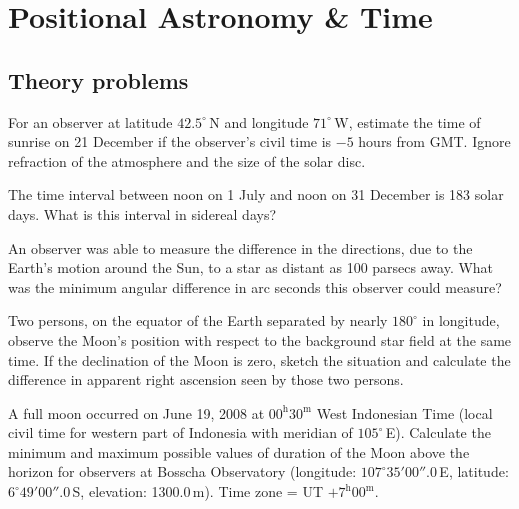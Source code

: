 \chapter{Positional Astronomy \& Time}

\section*{Theory problems}

For an observer at latitude $42.5^\circ$\,N and longitude $71^\circ$\,W,
estimate the time of sunrise on 21 December if the observer's civil time is
$-5$ hours from GMT. Ignore refraction of the atmosphere and the size of the
solar disc.

The time interval between noon on 1 July and noon on 31 December is 183 solar
days. What is this interval in sidereal days?

An observer was able to measure the difference in the directions, due to the
Earth's motion around the Sun, to a star as distant as 100 parsecs away. What
was the minimum angular difference in arc seconds this observer could measure?

Two persons, on the equator of the Earth separated by nearly $180^\circ$ in
longitude, observe the Moon's position with respect to the background star
field at the same time. If the declination of the Moon is zero, sketch the
situation and calculate the difference in apparent right ascension seen by
those two persons.

A full moon occurred on June 19, 2008 at $00^{\mathrm{h}}30^{\mathrm{m}}$ West
Indonesian Time (local civil time for western part of Indonesia with meridian
of $105^\circ$\,E). Calculate the minimum and maximum possible values of
duration of the Moon above the horizon for observers at Bosscha Observatory
(longitude: $107^\circ 35' 00''\!.0$\,E, latitude: $6^\circ 49' 00''\!.0$\,S,
elevation: 1300.0\,m). Time zone = UT $+7^{\mathrm{h}}00^{\mathrm{m}}$.


